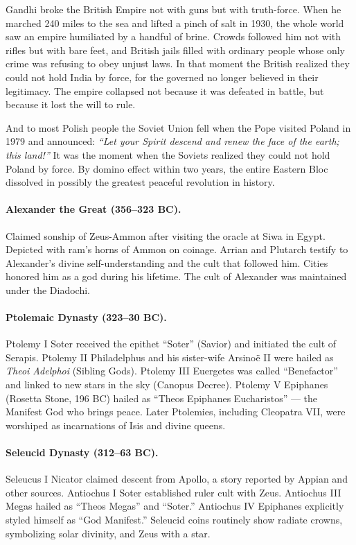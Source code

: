 Gandhi broke the British Empire not with guns but with truth-force.
When he marched 240 miles to the sea and lifted a pinch of salt in 1930, the whole world saw an empire humiliated by a handful of brine.
Crowds followed him not with rifles but with bare feet, and British jails filled with ordinary people whose only crime was refusing to obey unjust laws.
In that moment the British realized they could not hold India by force, for the governed no longer believed in their legitimacy.
The empire collapsed not because it was defeated in battle, but because it lost the will to rule.

And to most Polish people the Soviet Union fell when the Pope visited Poland in 1979 and announced:
\emph{“Let your Spirit descend and renew the face of the earth; this land!”}
It was the moment when the Soviets realized they could not hold Poland by force.
By domino effect within two years, the entire Eastern Bloc dissolved in possibly the greatest peaceful revolution in history.

\paragraph{Alexander the Great (356–323 BC).}
Claimed sonship of Zeus-Ammon after visiting the oracle at Siwa in Egypt.
Depicted with ram’s horns of Ammon on coinage.
Arrian and Plutarch testify to Alexander’s divine self-understanding and the cult that followed him.
Cities honored him as a god during his lifetime.
The cult of Alexander was maintained under the Diadochi.

\paragraph{Ptolemaic Dynasty (323–30 BC).}
Ptolemy I Soter received the epithet “Soter” (Savior) and initiated the cult of Serapis.
Ptolemy II Philadelphus and his sister-wife Arsinoë II were hailed as \textit{Theoi Adelphoi} (Sibling Gods).
Ptolemy III Euergetes was called “Benefactor” and linked to new stars in the sky (Canopus Decree).
Ptolemy V Epiphanes (Rosetta Stone, 196 BC) hailed as “Theos Epiphanes Eucharistos” — the Manifest God who brings peace.
Later Ptolemies, including Cleopatra VII, were worshiped as incarnations of Isis and divine queens.

\paragraph{Seleucid Dynasty (312–63 BC).}
Seleucus I Nicator claimed descent from Apollo, a story reported by Appian and other sources.
Antiochus I Soter established ruler cult with Zeus.
Antiochus III Megas hailed as “Theos Megas” and “Soter.”
Antiochus IV Epiphanes explicitly styled himself as “God Manifest.”
Seleucid coins routinely show radiate crowns, symbolizing solar divinity, and Zeus with a star.

